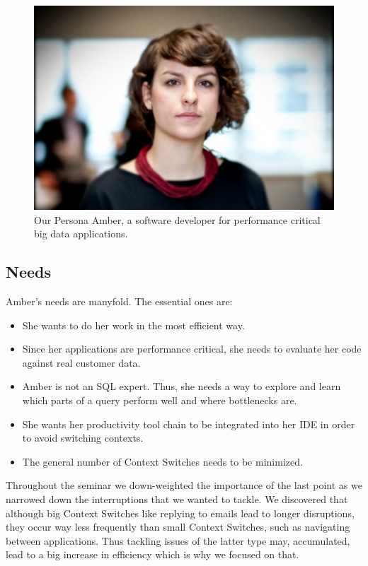 \begin{figure}
    \includegraphics[width=\linewidth]{images/amber}
    \caption{Our Persona Amber, a software developer for performance critical big data applications.}
    \label{fig:amber}
\end{figure}

\subsection{Needs}
Amber's needs are manyfold. The essential ones are:

\begin{itemize}
	\item She wants to do her work in the most efficient way.
	\item Since her applications are performance critical, she needs to evaluate her code against real customer data.
	\item Amber is not an SQL expert. Thus, she needs a way to explore and learn which parts of a query perform well and where bottlenecks are.
	\item She wants her productivity tool chain to be integrated into her IDE in order to avoid switching contexts.
	\item The general number of Context Switches needs to be minimized.
\end{itemize}

Throughout the seminar we down-weighted the importance of the last point as we narrowed down the interruptions that we wanted to tackle. We discovered that although big Context Switches like replying to emails lead to longer disruptions, they occur way less frequently than small Context Switches, such as navigating between applications. Thus tackling issues of the latter type may, accumulated, lead to a big increase in efficiency which is why we focused on that.

